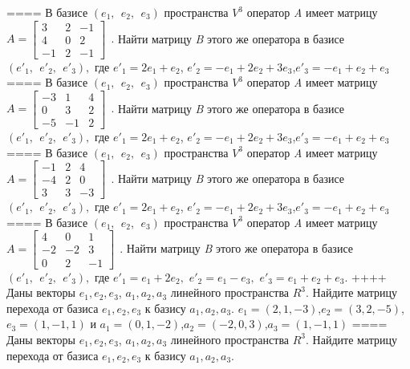 ====
В базисе \((e_{1},\ \ e_{2},\ \ e_{3})\) пространства \(V^{3}\) оператор \emph{A} имеет матрицу \(A = \begin{bmatrix}
3 & 2 & - 1 \\
4 & 0 & 2 \\
 - 1 & 2 & - 1
\end{bmatrix}\ \ .\) Найти матрицу \emph{B} этого же оператора в базисе \(({e'}_{1},\ \ {e'}_{2},\ \ {e'}_{3}),\) где \({e'}_{1} = 2e_{1} + e_{2}\), \({e'}_{2} = - e_{1} + 2e_{2} + 3e_{3}\),\({e'}_{3} = - e_{1} + e_{2} + e_{3}\)
====
В базисе \((e_{1},\ \ e_{2},\ \ e_{3})\) пространства \(V^{3}\) оператор \emph{A} имеет матрицу \(A = \begin{bmatrix}
 - 3 & 1 & 4 \\
0 & 3 & 2 \\
 - 5 & - 1 & 2
\end{bmatrix}\ \ .\) Найти матрицу \emph{B} этого же оператора в базисе \(({e'}_{1},\ \ {e'}_{2},\ \ {e'}_{3}),\) где \({e'}_{1} = 2e_{1} + e_{2}\), \({e'}_{2} = - e_{1} + 2e_{2} + 3e_{3}\),\({e'}_{3} = - e_{1} + e_{2} + e_{3}\)
====
В базисе \((e_{1},\ \ e_{2},\ \ e_{3})\) пространства \(V^{3}\) оператор \emph{A} имеет матрицу \(A = \begin{bmatrix}
 - 1 & 2 & 4 \\
 - 4 & 2 & 0 \\
3 & 3 & - 3
\end{bmatrix}\ \ .\) Найти матрицу \emph{B} этого же оператора в базисе \(({e'}_{1},\ \ {e'}_{2},\ \ {e'}_{3}),\) где \({e'}_{1} = 2e_{1} + e_{2}\), \({e'}_{2} = - e_{1} + 2e_{2} + 3e_{3}\),\({e'}_{3} = - e_{1} + e_{2} + e_{3}\)
====
В базисе \((e_{1},\ \ e_{2},\ \ e_{3})\) пространства \(V^{3}\) оператор \emph{A} имеет матрицу \(A = \begin{bmatrix}
4 & 0 & 1 \\
 - 2 & - 2 & 3 \\
0 & 2 & - 1
\end{bmatrix}\ \ .\) Найти матрицу \emph{B} этого же оператора в базисе \(({e'}_{1},\ \ {e'}_{2},\ \ {e'}_{3}),\) где \({e'}_{1} = e_{1} + 2e_{2},\) \({e'}_{2} = e_{1} - e_{3},\) \({e'}_{3} = e_{1} + e_{2} + e_{3}.\)
++++
Даны векторы \(e_{1},e_{2},e_{3}\), \(a_{1},a_{2},a_{3}\) линейного пространства \(R^{3}\). Найдите матрицу перехода от базиса \(e_{1},e_{2},e_{3}\) к базису \(a_{1},a_{2},a_{3}\).
\(e_{1} = (2,1, - 3)\),\(e_{2} = (3,2, - 5)\),\(e_{3} = (1, - 1,1)\) и \(a_{1} = (0,1, - 2)\),\(a_{2} = ( - 2,0,3)\),\(a_{3} = (1, - 1,1)\)
====
Даны векторы \(e_{1},e_{2},e_{3}\), \(a_{1},a_{2},a_{3}\) линейного пространства \(R^{3}\). Найдите матрицу перехода от базиса \(e_{1},e_{2},e_{3}\) к базису \(a_{1},a_{2},a_{3}\).
